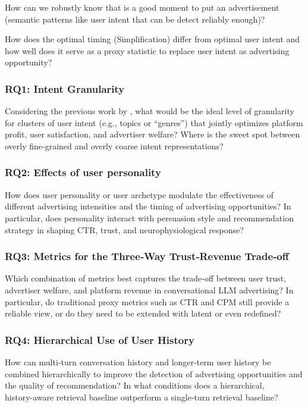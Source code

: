 \documentclass{article}
\begin{document}


How can we robustly know that is a good moment to put an advertisement (semantic patterns like user intent that can be detect reliably enough)?

How does the optimal timing (Simplification) differ from optimal user intent and how well does it serve as a proxy statistic to replace user intent as advertising opportunity?


\subsubsection{RQ1: Intent Granularity}

Considering the previous work by \cite{a}, what would be the ideal level of granularity for clusters of user intent (e.g., topics or “genres”) that jointly optimizes platform profit, user satisfaction, and advertiser welfare? Where is the sweet spot between overly fine‑grained and overly coarse intent representations?

\subsubsection{RQ2: Effects of user personality}

How does user personality or user archetype modulate the effectiveness of different advertising intensities and the timing of advertising opportunities? In particular, does personality interact with persuasion style and recommendation strategy in shaping CTR, trust, and neurophysiological response?

\subsubsection{RQ3: Metrics for the Three‑Way Trust‑Revenue Trade‑off}

Which combination of metrics best captures the trade‑off between user trust, advertiser welfare, and platform revenue in conversational LLM advertising? In particular, do traditional proxy metrics such as CTR and CPM still provide a reliable view, or do they need to be extended with latent or even redefined?

\subsubsection{RQ4: Hierarchical Use of User History}

How can multi‑turn conversation history and longer‑term user history be combined hierarchically to improve the detection of advertising opportunities and the quality of recommendation? In what conditions does a hierarchical, history‑aware retrieval baseline outperform a single‑turn retrieval baseline?
\end{document}
